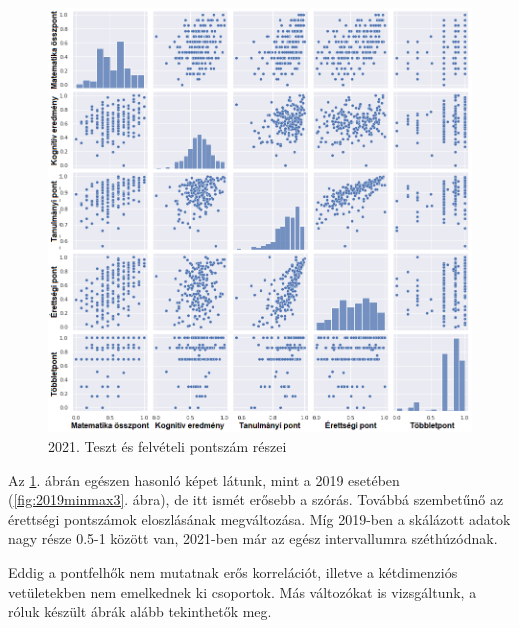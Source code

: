 \documentclass[12pt]{article}
\begin{document}
\begin{figure}[H]
\centering
\includegraphics[width=\textwidth]{kepek/2021minmax3.png}
\caption{2021. Teszt és felvételi pontszám részei}
\label{fig:2021minmax3}
\end{figure}

Az \ref{fig:2021minmax3}. ábrán egészen hasonló képet látunk, mint a 2019 esetében (\ref{fig:2019minmax3}. ábra), de itt ismét erősebb a szórás. Továbbá szembetűnő az érettségi pontszámok eloszlásának megváltozása. Míg 2019-ben a skálázott adatok nagy része 0.5-1 között van, 2021-ben már az egész intervallumra széthúzódnak. 

Eddig a pontfelhők nem mutatnak erős korrelációt, illetve a kétdimenziós vetületekben nem emelkednek ki csoportok. Más változókat is vizsgáltunk, a róluk készült ábrák alább tekinthetők meg.
\end{document}
